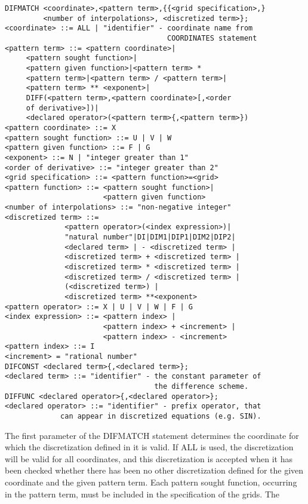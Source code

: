 {\small\begin{verbatim}
DIFMATCH <coordinate>,<pattern term>,{{<grid specification>,}
         <number of interpolations>, <discretized term>};
<coordinate> ::= ALL | "identifier" - coordinate name from
                                      COORDINATES statement
<pattern term> ::= <pattern coordinate>|
     <pattern sought function>|
     <pattern given function>|<pattern term> *
     <pattern term>|<pattern term> / <pattern term>|
     <pattern term> ** <exponent>|
     DIFF(<pattern term>,<pattern coordinate>[,<order
     of derivative>])|
     <declared operator>(<pattern term>{,<pattern term>})
<pattern coordinate> ::= X
<pattern sought function> ::= U | V | W
<pattern given function> ::= F | G
<exponent> ::= N | "integer greater than 1"
<order of derivative> ::= "integer greater than 2"
<grid specification> ::= <pattern function>=<grid>
<pattern function> ::= <pattern sought function>|
                       <pattern given function>
<number of interpolations> ::= "non-negative integer"
<discretized term> ::=
              <pattern operator>(<index expression>)|
              "natural number"|DI|DIM1|DIP1|DIM2|DIP2|
              <declared term> | - <discretized term> |
              <discretized term> + <discretized term> |
              <discretized term> * <discretized term> |
              <discretized term> / <discretized term> |
              (<discretized term>) |
              <discretized term> **<exponent>
<pattern operator> ::= X | U | V | W | F | G
<index expression> ::= <pattern index> |
                       <pattern index> + <increment> |
                       <pattern index> - <increment>
<pattern index> ::= I
<increment> = "rational number"
DIFCONST <declared term>{,<declared term>};
<declared term> ::= "identifier" - the constant parameter of
                                   the difference scheme.
DIFFUNC <declared operator>{,<declared operator>};
<declared operator> ::= "identifier" - prefix operator, that
             can appear in discretized equations (e.g. SIN).
\end{verbatim}}
The first parameter of the DIFMATCH statement determines  the coordinate
for which the discretization defined in it is valid. If ALL is used, the
discretization  will   be   valid   for   all   coordinates,   and  this
discretization is  accepted when  it has  been checked whether there has
been no other discretization  defined for  the given  coordinate and the
given  pattern  term.  Each  pattern  sought  function, occurring in the
pattern term, must be included in  the specification  of the  grids. The

